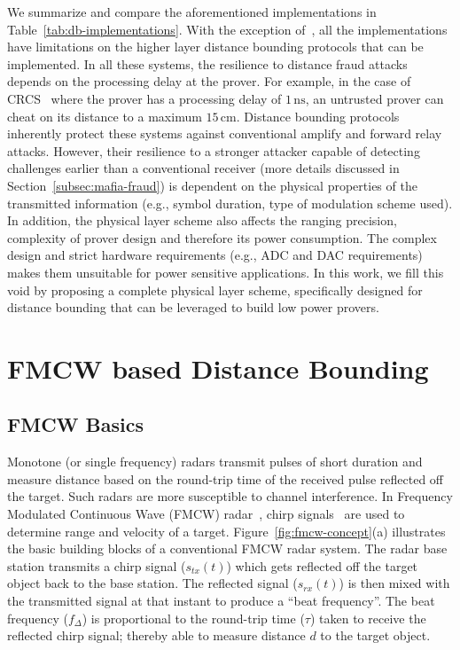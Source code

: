 \documentclass{sig-alternate-10pt}
\newcommand{\eg}{e.g.,\xspace}
\newcommand{\unit}[1]{\ensuremath{\, \mathrm{#1}}}
\begin{document}
We summarize and compare the aforementioned implementations in
Table~\ref{tab:db-implementations}. With the exception of~\cite{Tippenhauer12},
all the implementations have limitations on the higher layer distance bounding
protocols that can be implemented. In all these systems, the resilience to
distance fraud attacks depends on the processing delay at the prover. For
example, in the case of CRCS~\cite{RasmussenAug10} where the prover has a
processing delay of $1\unit{ns}$, an untrusted prover can cheat on its distance to a
maximum $15\unit{cm}$. Distance bounding protocols inherently protect these
systems against conventional amplify and forward relay attacks. However, their
resilience to a stronger attacker capable of detecting challenges earlier than a
conventional receiver (more details discussed in
Section~\ref{subsec:mafia-fraud}) is dependent on the physical properties of
the transmitted information (\eg symbol duration, type of modulation scheme
used). In addition, the physical layer scheme also affects the ranging
precision, complexity of prover design and therefore its power consumption. The
complex design and strict hardware requirements (\eg ADC and DAC requirements)
makes them unsuitable for power sensitive applications. In this work, we fill
this void by proposing a complete physical layer scheme, specifically designed
for distance bounding that can be leveraged to build low power provers.
 
\section{FMCW based Distance Bounding}
\label{sec:fmcw-based-db}

\subsection{FMCW Basics}
\label{sec:fmcw-radar-background}

Monotone (or single frequency) radars transmit pulses of short duration and
measure distance based on the round-trip time of the received pulse reflected
off the target. Such radars are more susceptible to channel interference. In
Frequency Modulated Continuous Wave (FMCW) radar~\cite{StoveOct92}, chirp
signals~\cite{BerniJun73} are used to determine range and velocity of a target.
Figure~\ref{fig:fmcw-concept}(a) illustrates the basic building blocks of a
conventional FMCW radar system. The radar base station transmits a chirp signal
($s_{tx}(t)$) which gets reflected off the target object back to the base
station. The reflected signal ($s_{rx}(t)$) is then mixed with the transmitted
signal at that instant to produce a ``beat frequency''. The beat frequency
($f_{\Delta}$) is proportional to the round-trip time ($\tau$) taken to receive
the reflected chirp signal; thereby able to measure distance $d$ to the target
object.
\end{document}
